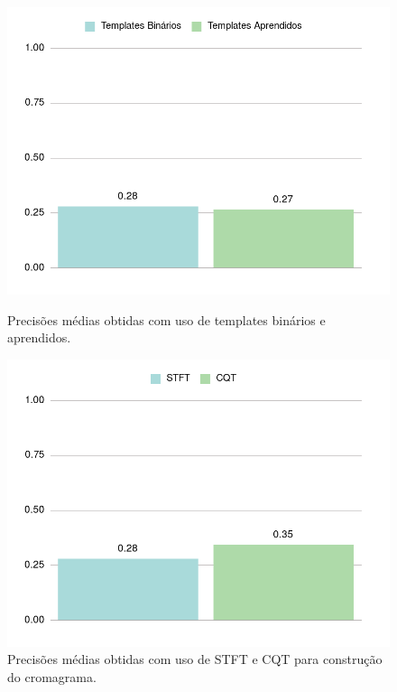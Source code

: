     \begin{figure}[htb]
        \begin{center}
            \includegraphics[width=13cm]{figuras/01-templates-binarios-e-aprendidos.png}
            \caption{\label{fig:exp:templates}Precisões médias obtidas com uso de templates binários e aprendidos.}
        
            \includegraphics[width=13cm]{figuras/02-stft-e-cqt-com-templates-binarios.png}
            \caption{\label{fig:exp:chroma}Precisões médias obtidas com uso de STFT e CQT para construção do cromagrama.}
        \end{center}
    \end{figure}
    

